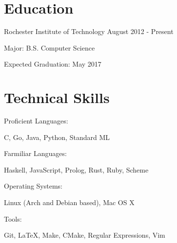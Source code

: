 \documentclass[a4paper,margin,line]{resume}
\newcommand{\rdate}[1]{\hfill {\small #1}}
\begin{document}
\begin{resume}

\section{\mysidestyle Education}
\begin{compactdesc}
    \item[Rochester Institute of Technology] \rdate{August 2012 - Present}
    \begin{asparablank} { \small
        \item Major: B.S. Computer Science
        \item Expected Graduation: May 2017
    } \end{asparablank}
\end{compactdesc}

\section{\mysidestyle Technical Skills}
\begin{compactdesc}
    \item[Proficient Languages:]
    \begin{asparablank} {\small
        \item C, Go, Java, Python, Standard ML
    } \end{asparablank}

    \item[Farmiliar Languages:]
    \begin{asparablank} {\small
        \item Haskell, JavaScript, Prolog, Rust, Ruby, Scheme
    } \end{asparablank}

    \item[Operating Systems:]
    \begin{asparablank} {\small
        \item Linux (Arch and Debian based), Mac OS X
    } \end{asparablank}

    \item[Tools:]
    \begin{asparablank} { \small
        \item Git, \LaTeX, Make, CMake, Regular Expressions, Vim
    } \end{asparablank}
\end{compactdesc}


\end{resume}
\end{document}

